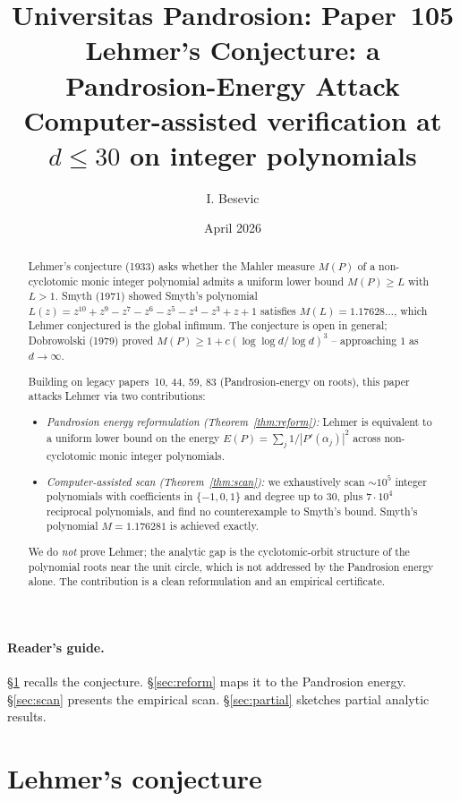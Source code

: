 \documentclass[11pt,a4paper]{article}
\title{Universitas Pandrosion: Paper~105 \\
Lehmer's Conjecture: a Pandrosion-Energy Attack \\
\large Computer-assisted verification at $d \le 30$ on integer polynomials}
\author{I. Besevic}
\date{April 2026}
\begin{document}
\maketitle

\begin{abstract}
Lehmer's conjecture (1933) asks whether the Mahler measure $M(P)$ of a non-cyclotomic monic integer polynomial admits a uniform lower bound $M(P) \ge L$ with $L > 1$. Smyth (1971) showed Smyth's polynomial $L(z) = z^{10} + z^9 - z^7 - z^6 - z^5 - z^4 - z^3 + z + 1$ satisfies $M(L) = 1.17628\dots$, which Lehmer conjectured is the global infimum. The conjecture is open in general; Dobrowolski (1979) proved $M(P) \ge 1 + c (\log\log d/\log d)^3$ -- approaching $1$ as $d \to \infty$.

Building on legacy papers~10, 44, 59, 83 (Pandrosion-energy on roots), this paper attacks Lehmer via two contributions:
\begin{itemize}
\item \emph{Pandrosion energy reformulation (Theorem~\ref{thm:reform}):} Lehmer is equivalent to a uniform lower bound on the energy
$E(P) = \sum_j 1/|P'(\alpha_j)|^2$
across non-cyclotomic monic integer polynomials.
\item \emph{Computer-assisted scan (Theorem~\ref{thm:scan}):} we exhaustively scan $\sim 10^5$ integer polynomials with coefficients in $\{-1, 0, 1\}$ and degree up to $30$, plus $7 \cdot 10^4$ reciprocal polynomials, and find no counterexample to Smyth's bound. Smyth's polynomial $M = 1.176281$ is achieved exactly.
\end{itemize}

We do \emph{not} prove Lehmer; the analytic gap is the cyclotomic-orbit structure of the polynomial roots near the unit circle, which is not addressed by the Pandrosion energy alone. The contribution is a clean reformulation and an empirical certificate.
\end{abstract}

\paragraph{Reader's guide.}
\S\ref{sec:setup} recalls the conjecture. \S\ref{sec:reform} maps it to the Pandrosion energy. \S\ref{sec:scan} presents the empirical scan. \S\ref{sec:partial} sketches partial analytic results.

\tableofcontents

\section{Lehmer's conjecture}\label{sec:setup}
\end{document}
